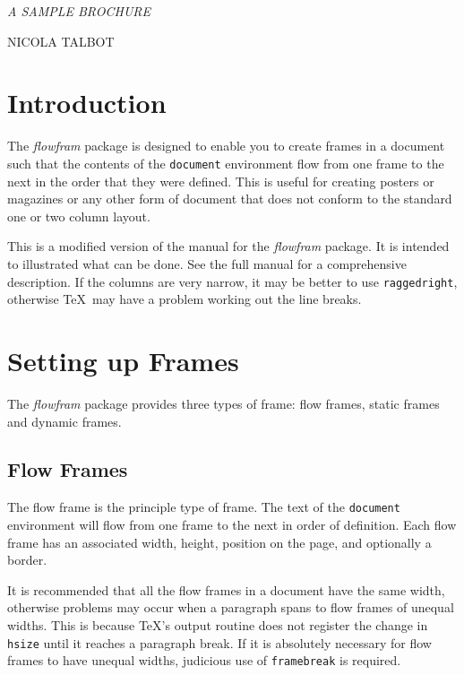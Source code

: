 \documentclass[a4paper]{report}
\newcommand{\env}[1]{\texttt{#1}}
\newcommand{\cmdname}[1]{\texttt{\symbol{92}#1}}
\begin{document}

{\noindent
\slshape\Huge\MakeUppercase{A Sample Brochure}\par
\vskip0.5in
\noindent\large\MakeUppercase{Nicola Talbot}\\
}


\chapter{Introduction}

The \textsl{flowfram} package is designed to enable you to create
frames in a document such that the 
contents of the \env{document} environment flow from one 
frame to the next in the order that they were defined.  
This is useful for creating posters
or magazines or any other form of document that does not 
conform to the standard one or two column layout.

This is a modified version of the manual for the \textsl{flowfram} package.
It is intended to illustrated what can be done. See the full manual for
a comprehensive description.
If the columns are very narrow, it may be better to
use \cmdname{raggedright}, otherwise \TeX\ may have a
problem working out the line breaks.

\chapter{Setting up Frames}

The \textsl{flowfram} package provides three types of frame:
{flow frames}, {static 
frames} and {dynamic frames}.

\section*{Flow Frames}

The flow frame is the principle type of frame.
The text of the \env{document} environment will flow from 
one frame to the next in order of definition. Each 
flow frame has an associated width, height, 
position on the page, and optionally a border.

It is recommended that all the flow frames in a document
have the same width, otherwise problems may occur
when a paragraph spans to flow frames of unequal
widths. This is because \TeX's output routine does not
register the change in \cmdname{hsize} until it reaches
a paragraph break. If it is absolutely necessary for 
flow frames to have unequal widths, judicious use of
\cmdname{framebreak} is required.
\end{document}
